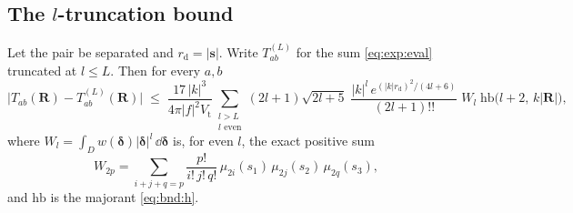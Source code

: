 \subsection{\texorpdfstring{The $l$-truncation bound}{The l-truncation bound}}
\label{sec:bnd:rem}

\begin{theorem}
\label{thm:bnd:rem}
Let the pair be separated and $r_{\mathrm{d}} = |\mathbf{s}|$. Write
$T^{(L)}_{ab}$ for the sum \eqref{eq:exp:eval} truncated at $l \le L$. Then for every
$a,b$
\begin{equation}
\bigl|T_{ab}(\mathbf{R}) - T^{(L)}_{ab}(\mathbf{R})\bigr|
\;\le\;
\frac{17\,|k|^{3}}{4\pi|f|^{2}V_{\mathrm{t}}}
\sum_{\substack{l > L\\ l \text{ even}}}
(2l+1)\sqrt{2l+5}\;
\frac{|k|^{l}\,e^{(|k|r_{\mathrm{d}})^{2}/(4l+6)}}{(2l+1)!!}\;
W_l\;\mathrm{hb}\bigl(l+2,\,k|\mathbf{R}|\bigr),
\label{eq:bnd:rem}
\end{equation}
where $W_l = \int_D w(\boldsymbol{\delta})|\boldsymbol{\delta}|^{l}\,
\dd\boldsymbol{\delta}$ is, for even $l$, the exact positive sum
\begin{equation}
W_{2p} = \sum_{i+j+q=p}\frac{p!}{i!\,j!\,q!}\,
\mu_{2i}(s_1)\,\mu_{2j}(s_2)\,\mu_{2q}(s_3),
\label{eq:bnd:W}
\end{equation}
and $\mathrm{hb}$ is the majorant \eqref{eq:bnd:h}.
\end{theorem}

